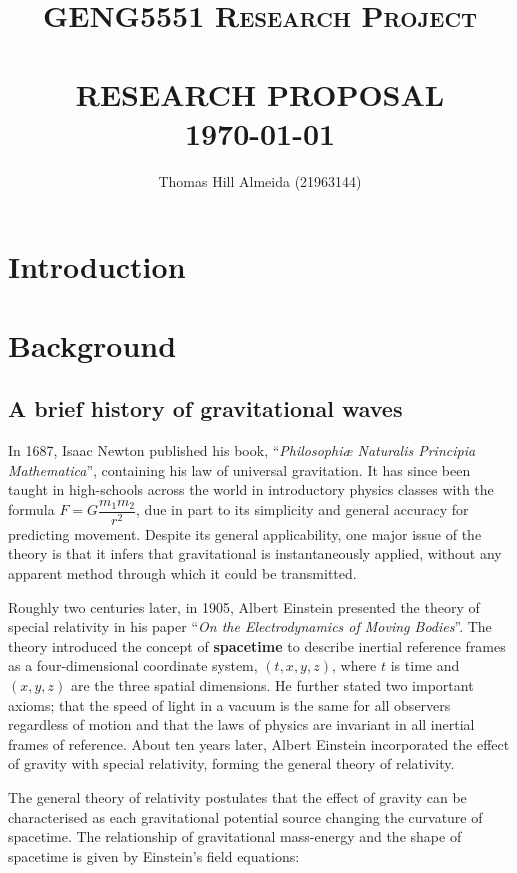 \documentclass{article}
\title{\normalsize \textsc{GENG5551 Research Project}
        \\ [1.5cm]
        \HRule{0.5pt} \\
        \LARGE \textbf{\uppercase{Research Proposal}}
        \HRule{2pt} \\ [0.5cm]
        \normalsize \today \vspace*{3\baselineskip}}
\author{Thomas Hill Almeida (21963144)}
\date{}
\begin{document}
\maketitle{}
\tableofcontents{}
\newpage{}

\section*{Introduction}
\section{Background}

\subsection{A brief history of gravitational waves}

In 1687, Isaac Newton published his book, ``\textit{Philosophi\ae{} Naturalis Principia Mathematica}'', containing his law of universal gravitation. It has since been taught in high-schools across the world in introductory physics classes with the formula \( F = G\dfrac{m_1m_2}{r^2} \), due in part to its simplicity and general accuracy for predicting movement. Despite its general applicability, one major issue of the theory is that it infers that gravitational is instantaneously applied, without any apparent method through which it could be transmitted.

Roughly two centuries later, in 1905, Albert Einstein presented the theory of special relativity in his paper ``\textit{On the Electrodynamics of Moving Bodies}''. The theory introduced the concept of \textbf{spacetime} to describe inertial reference frames as a four-dimensional coordinate system, \((t, x, y, z)\), where $t$ is time and $(x, y, z)$ are the three spatial dimensions. He further stated two important axioms; that the speed of light in a vacuum is the same for all observers regardless of motion and that the laws of physics are invariant in all inertial frames of reference. About ten years later, Albert Einstein incorporated the effect of gravity with special relativity, forming the general theory of relativity.

The general theory of relativity postulates that the effect of gravity can be characterised as each gravitational potential source changing the curvature of spacetime. The relationship of gravitational mass-energy and the shape of spacetime is given by Einstein's field equations:
\end{document}
